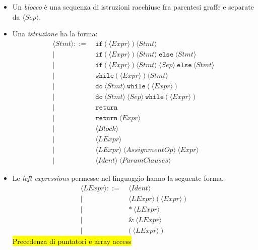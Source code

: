 \documentclass[11pt,a4paper,italian]{article}
\newcommand{\token}[1]{\langle \mathit{#1} \rangle }
\begin{document}
\begin{itemize}
\begin{itemize}
	\end{itemize}

	\item Un \emph{blocco} è una sequenza di istruzioni racchiuse fra parentesi graffe e separate da $\token{Sep}$.
	
	\item Una \emph{istruzione} ha la forma:
	\begin{align*}
	\token{Stmt} ::=\ &\texttt{if}\ \texttt{(}\ \token{Expr}\ \texttt{)}\ \token{Stmt}\\
	|\ &\texttt{if}\ \texttt{(}\ \token{Expr}\ \texttt{)}\ \token{Stmt}\ \texttt{else}\ \token{Stmt}\\
	|\ &\texttt{if}\ \texttt{(}\ \token{Expr}\ \texttt{)}\ \token{Stmt}\ \token{Sep}\ \texttt{else}\ \token{Stmt}\\
	|\ &\texttt{while}\ \texttt{(}\ \token{Expr}\ \texttt{)}\ \token{Stmt}\\
	|\ &\texttt{do}\ \token{Stmt}\ \texttt{while}\ \texttt{(}\ \token{Expr}\ \texttt{)}\\
	|\ &\texttt{do}\ \token{Stmt}\ \token{Sep}\ \texttt{while}\ \texttt{(}\ \token{Expr}\ \texttt{)}\\
	|\ &\texttt{return}\\
	|\ &\texttt{return}\ \token{Expr}\\
	|\ &\token{Block}\\
	|\ &\token{LExpr}\\
	|\ &\token{LExpr}\ \token{AssignmentOp}\ \token{Expr}\\
	|\ &\token{Ident}\ \token{ParamClauses}
	\end{align*}
	
	\item Le \emph{left expressions} permesse nel linguaggio hanno la seguente forma.
	\begin{align*}
	\token{LExpr} ::=\ &\token{Ident}\\
	|\ &\token{LExpr}\ \texttt{(}\ \token{Expr}\ \texttt{)}\\
	|\ &\texttt{*}\ \token{LExpr}\\
	|\ &\texttt{\&}\ \token{LExpr}\\
	|\ &\texttt{(}\ \token{LExpr}\ \texttt{)}
	\end{align*}
	\hl{Precedenza di puntatori e array access}


\end{itemize}
\end{document}
